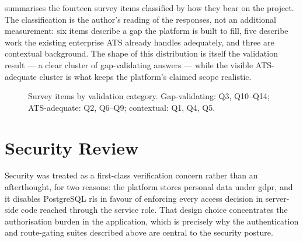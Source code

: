  summarises the fourteen survey items
classified by how they bear on the project. The classification is the
author's reading of the responses, not an additional measurement: six items
describe a gap the platform is built to fill, five describe work the existing
enterprise ATS already handles adequately, and three are contextual
background. The shape of this distribution is itself the validation result
--- a clear cluster of gap-validating answers --- while the visible ATS-adequate
cluster is what keeps the platform's claimed scope realistic.

\begin{figure}[ht]
\centering
{}
\caption[Survey items by validation category]{Survey items by validation
category. Gap-validating: Q3, Q10--Q14; ATS-adequate: Q2, Q6--Q9; contextual:
Q1, Q4, Q5.}
\label{fig:survey-classification}
\end{figure}


\section{Security Review}
\label{sec:val-security}

Security was treated as a first-class verification concern rather than an
afterthought, for two reasons: the platform stores personal
data under \gls{gdpr}, and it disables PostgreSQL \gls{rls} in
favour of enforcing every access decision in server-side code reached
through the service role. That design choice concentrates the
authorisation burden in the application, which is precisely why the
authentication and route-gating suites described above are central to the
security posture.


